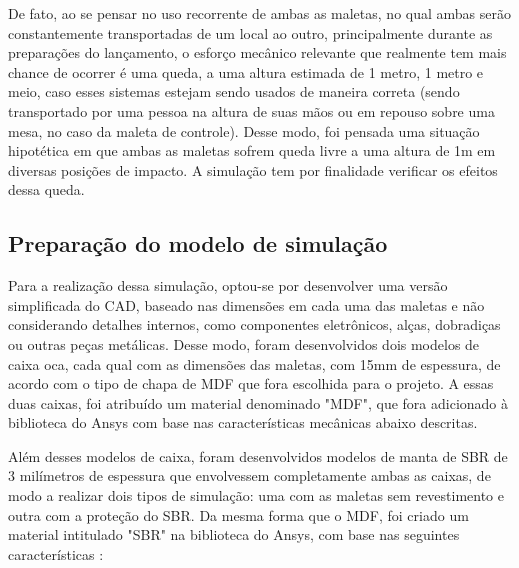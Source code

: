\par De fato, ao se pensar no uso recorrente de ambas as maletas, no qual ambas serão constantemente transportadas de um local ao outro, principalmente durante as preparações do lançamento, o esforço mecânico relevante que realmente tem mais chance de ocorrer é uma queda, a uma altura estimada de 1 metro, 1 metro e meio, caso esses sistemas estejam sendo usados de maneira correta (sendo transportado por uma pessoa na altura de suas mãos ou em repouso sobre uma mesa, no caso da maleta de controle). Desse modo, foi pensada uma situação hipotética em que ambas as maletas sofrem queda livre a uma altura de 1m em diversas posições de impacto. A simulação  tem por finalidade verificar os efeitos dessa queda.

\subsection{Preparação do modelo de simulação}

\par Para a realização dessa simulação, optou-se por desenvolver uma versão simplificada do CAD, baseado nas dimensões em cada uma das maletas e não considerando detalhes internos, como componentes eletrônicos, alças, dobradiças ou outras peças metálicas. Desse modo, foram desenvolvidos dois modelos de caixa oca, cada qual com as dimensões das maletas, com 15mm de espessura, de acordo com o tipo de chapa de MDF que fora escolhida para o projeto. A essas duas caixas, foi atribuído um material denominado "MDF", que fora adicionado à biblioteca do Ansys com base nas características mecânicas abaixo descritas.

\par Além desses modelos de caixa, foram desenvolvidos modelos de manta de SBR de 3 milímetros de espessura que envolvessem completamente ambas as caixas, de modo a realizar dois tipos de simulação: uma com as maletas sem revestimento e outra com a proteção do SBR. Da mesma forma que o MDF, foi criado um material intitulado "SBR" na biblioteca do Ansys, com base nas seguintes características  \cite{azomaterials} \cite{makeitfrom.com}:


